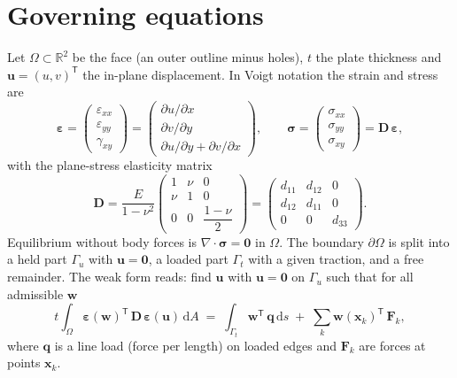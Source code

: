 \documentclass[11pt,a4paper]{article}
\newcommand{\vect}[1]{\mathbf{#1}}
\newcommand{\mat}[1]{\mathbf{#1}}
\begin{document}
\section{Governing equations}

Let $\Omega\subset\mathbb{R}^2$ be the face (an outer outline minus holes),
$t$ the plate thickness and $\vect{u}=(u,v)^{\mathsf T}$ the in-plane
displacement. In Voigt notation the strain and stress are
\begin{equation}
  \boldsymbol{\varepsilon} =
  \begin{pmatrix} \varepsilon_{xx}\\ \varepsilon_{yy}\\ \gamma_{xy} \end{pmatrix}
  =
  \begin{pmatrix}
    \partial u/\partial x\\
    \partial v/\partial y\\
    \partial u/\partial y + \partial v/\partial x
  \end{pmatrix},
  \qquad
  \boldsymbol{\sigma} =
  \begin{pmatrix} \sigma_{xx}\\ \sigma_{yy}\\ \sigma_{xy} \end{pmatrix}
  = \mat{D}\,\boldsymbol{\varepsilon},
\end{equation}
with the plane-stress elasticity matrix
\begin{equation}
  \mat{D} = \frac{E}{1-\nu^2}
  \begin{pmatrix}
    1 & \nu & 0\\
    \nu & 1 & 0\\
    0 & 0 & \dfrac{1-\nu}{2}
  \end{pmatrix}
  =
  \begin{pmatrix}
    d_{11} & d_{12} & 0\\
    d_{12} & d_{11} & 0\\
    0 & 0 & d_{33}
  \end{pmatrix}.
  \label{eq:D}
\end{equation}
Equilibrium without body forces is $\nabla\cdot\boldsymbol{\sigma}=\vect{0}$
in $\Omega$. The boundary $\partial\Omega$ is split into a held part
$\Gamma_u$ with $\vect{u}=\vect{0}$, a loaded part $\Gamma_t$ with a given
traction, and a free remainder. The weak form reads: find $\vect{u}$ with
$\vect{u}=\vect{0}$ on $\Gamma_u$ such that for all admissible $\vect{w}$
\begin{equation}
  t\int_\Omega \boldsymbol{\varepsilon}(\vect{w})^{\mathsf T}\,\mat{D}\,
               \boldsymbol{\varepsilon}(\vect{u})\,\mathrm{d}A
  \;=\; \int_{\Gamma_t} \vect{w}^{\mathsf T}\,\vect{q}\,\mathrm{d}s
  \;+\; \sum_k \vect{w}(\vect{x}_k)^{\mathsf T}\,\vect{F}_k ,
  \label{eq:weak}
\end{equation}
where $\vect{q}$ is a line load (force per length) on loaded edges and
$\vect{F}_k$ are forces at points $\vect{x}_k$.
\end{document}
